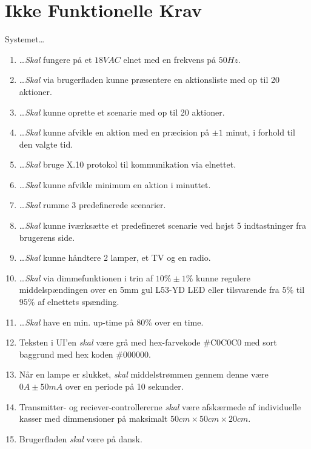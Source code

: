 \section{Ikke Funktionelle Krav} \label{ikkeFunkKrav}
Systemet\ldots 
\begin{enumerate}\itemsep1pt \parskip0pt 
	\item \ldots \emph{Skal} fungere på et $18 VAC$ elnet med en frekvens på $50Hz$.
	\item \ldots \emph{Skal} via brugerfladen kunne præsentere en aktionsliste med op til 20 aktioner.
	\item \ldots \emph{Skal} kunne oprette et scenarie med op til 20 aktioner.
	\item \ldots \emph{Skal} kunne afvikle en aktion med en præcision på $\pm 1$ minut, i forhold til den valgte tid.
	\item \ldots \emph{Skal} bruge X.10 protokol\cite{lib:AN236} til kommunikation via elnettet.
	\item \ldots \emph{Skal} kunne afvikle minimum en aktion i minuttet.
	\item \ldots \emph{Skal} rumme 3 predefinerede scenarier.
	\item \ldots \emph{Skal} kunne iværksætte et predefineret scenarie ved højst 5 indtastninger fra brugerens side.
	\item \ldots \emph{Skal} kunne håndtere 2 lamper, et TV og en radio.
	\item \ldots \emph{Skal} via dimmefunktionen i trin af $10\% \pm 1\%$ kunne regulere middelspændingen over en 5mm gul L53-YD LED eller tilsvarende fra $5\%$ til $95\%$ af elnettets spænding.
	\item \ldots \emph{Skal} have en min. up-time på 80\% over en time.
	\item Teksten i UI'en \emph{skal} være grå med hex-farvekode \#C0C0C0 med sort baggrund med hex koden \#000000.
	\item Når en lampe er slukket, \emph{skal} middelstrømmen gennem denne være $0A \pm 50 mA$ over en periode på 10 sekunder.
	\item Transmitter- og reciever-controllererne \emph{skal} være afskærmede af individuelle kasser med dimmensioner på maksimalt $50cm \times 50cm \times 20cm$.
	\item Brugerfladen \emph{skal} være på dansk.
\end{enumerate}
\clearpage

